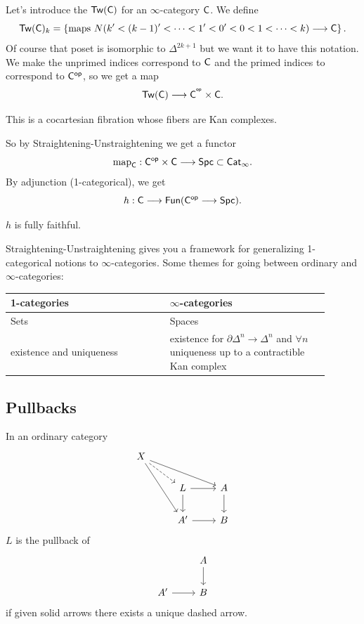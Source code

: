 Let's introduce the  $\mathsf{Tw}(\mathsf{C})$ for an $\infty$-category
$\mathsf{C}$. We define
\[
	\cat{Tw}(\C)_k = \left\{ \text{maps }N(k'<(k-1)'<\dots<1'<0'<0<1<\dots<k)\to \C \right\} .
\]
Of course that poset is isomorphic to $\Delta^{2k+1}$ but we want it to have this
notation. We make the unprimed indices correspond to $\mathsf{C}$ and the primed indices to
correspond to $\mathsf{C}^\mathsf{op}$, so we get a map
\[
	\cat{Tw}(\C) \to  \C^{\op}\times \C.
\]
\begin{lemma}
	This is a cocartesian fibration whose fibers are Kan complexes.
\end{lemma}
So by Straightening-Unstraightening we get a functor
\[
	\map_\C : \C\op\times \C \to \cat{Spc} \subset \cat{Cat}_\infty.
\]
By adjunction (1-categorical), we get
\[
	h:\C \to \cat{Fun}(\cat{C}\op\to \cat{Spc}).
\]
\begin{theorem}
	$h$ is fully faithful.
\end{theorem}
\begin{remark}
	Straightening-Unstraightening gives you a framework for generalizing 1-categorical
	notions to $\infty$-categories. Some themes for going between ordinary and $\infty$-categories:
	\begin{table}[h]
		\centering
		\label{tab:themes}
		\begin{tabular}{p{0.45\linewidth} | p{0.45\linewidth}}
			1-categories & $\infty$-categories \\ \hline
			Sets & Spaces \\
			existence and uniqueness & existence for $\partial \Delta^{n}\to \Delta^{n}$ and
			$\forall n$ uniqueness up to a contractible Kan complex
		\end{tabular}
	\end{table}
\end{remark}

\subsection{Pullbacks}
In an ordinary category
\[
	\begin{tikzcd}
		X \ar[dr,dashed] \ar[drr] \ar[ddr] \\
		& L \ar[r] \ar[d] & A \ar[d] \\
		& A' \ar[r] & B
	\end{tikzcd}
\]
$L$ is the pullback of
\[
	\begin{tikzcd}
		& A \ar[d] \\
		A' \ar[r] & B
	\end{tikzcd}
\]
if given solid arrows there exists a unique dashed arrow.

